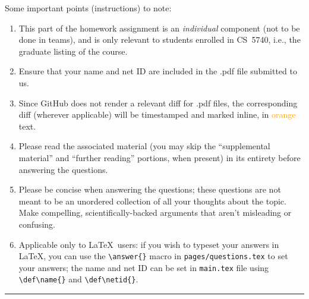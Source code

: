 
Some important points (instructions) to note:

\begin{enumerate}[label=(\alph*)]
    \item This part of the homework assignment is an \textit{individual} 
    component (not to be done in teams), and is only relevant to students 
    enrolled in CS~5740, i.e., the graduate listing of the course.
    \item Ensure that your name and net ID are included in the .pdf file 
    submitted to us.
    \item Since GitHub does not render a relevant diff for .pdf files, the 
    corresponding diff (wherever applicable) will be timestamped and marked 
    inline, in \textcolor{orange}{orange} text.
    \item Please read the associated material (you may skip the ``supplemental 
    material'' and ``further reading'' portions, when present) in its entirety 
    before answering the questions.
    \item Please be concise when answering the questions; these questions are 
    not meant to be an unordered collection of all your thoughts about the 
    topic. Make compelling, scientifically-backed arguments that aren't 
    misleading or confusing.
    \item Applicable only to \LaTeX~users: if you wish to typeset your answers 
    in \LaTeX, you can use the \texttt{{\textbackslash}answer\{\}} macro in 
    \texttt{pages/questions.tex} to set your answers; the name and net ID can 
    be set in \texttt{main.tex} file using 
    \texttt{{\textbackslash}def{\textbackslash}name\{\}} and 
    \texttt{{\textbackslash}def{\textbackslash}netid\{\}}.
\end{enumerate}

\vspace{0.5em}
\hrule
\newpage

